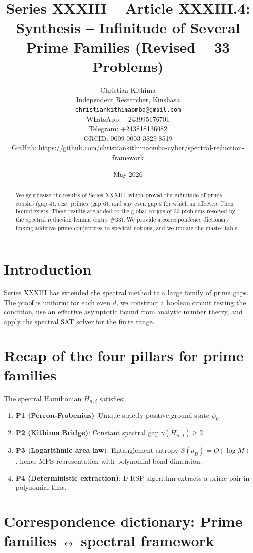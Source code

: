 \documentclass[11pt,a4paper]{article}
\title{Series XXXIII – Article XXXIII.4: Synthesis – Infinitude of Several Prime Families (Revised – 33 Problems)}
\author{Christian Kithima \\
Independent Researcher, Kinshasa \\
\texttt{christiankithimaomba@gmail.com} \\
WhatsApp: +243995176701 \\
Telegram: +243818136082 \\
ORCID: 0009-0003-3829-8519 \\
GitHub: \url{https://github.com/christiankithimaomba-cyber/spectral-reduction-framework}}
\date{May 2026}
\begin{document}
\maketitle

\begin{abstract}
We synthesise the results of Series XXXIII, which proved the infinitude of prime cousins (gap 4), sexy primes (gap 6), and any even gap \(d\) for which an effective Chen bound exists. These results are added to the global corpus of 33 problems resolved by the spectral reduction lemma (entry \#33). We provide a correspondence dictionary linking additive prime conjectures to spectral notions, and we update the master table.
\end{abstract}

\tableofcontents

\section{Introduction}

Series XXXIII has extended the spectral method to a large family of prime gaps. The proof is uniform: for each even \(d\), we construct a boolean circuit testing the condition, use an effective asymptotic bound from analytic number theory, and apply the spectral SAT solver for the finite range.

\section{Recap of the four pillars for prime families}

The spectral Hamiltonian \(H_{n,d}\) satisfies:

\begin{enumerate}
\item \textbf{P1 (Perron‑Frobenius)}: Unique strictly positive ground state \(\psi_0\).
\item \textbf{P2 (Kithima Bridge)}: Constant spectral gap \(\gamma(H_{n,d}) \ge 2\).
\item \textbf{P3 (Logarithmic area law)}: Entanglement entropy \(S(\rho_B)=O(\log M)\), hence MPS representation with polynomial bond dimension.
\item \textbf{P4 (Deterministic extraction)}: D‑RSP algorithm extracts a prime pair in polynomial time.
\end{enumerate}

\section{Correspondence dictionary: Prime families ↔ spectral framework}
\end{document}
